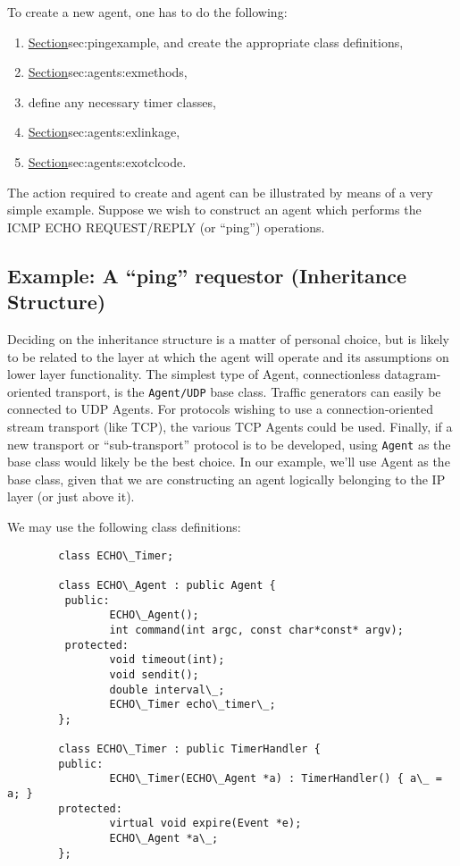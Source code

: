 To create a new agent, one has to do the following:
\begin{enumerate}\itemsep0pt
        \item \href{decide its inheritance structure}{Section}{sec:pingexample},
                and create the appropriate class definitions,
        \item \href{define the \fcn[]{recv} and \fcn[]{timeout} methods}{%
                Section}{sec:agents:exmethods},
        \item define any necessary timer classes,
        \item \href{define OTcl linkage functions}{Section}{sec:agents:exlinkage},
        \item \href{write the necessary OTcl code to access the agent}{Section}{sec:agents:exotclcode}.
\end{enumerate}

The action required to create and agent can be illustrated
by means of a very simple example.
Suppose we wish to construct an agent which performs
the ICMP ECHO REQUEST/REPLY (or ``ping'') operations.

\subsection{Example: A ``ping'' requestor (Inheritance Structure)}
\label{sec:pingexample}

Deciding on the inheritance structure is a matter of personal choice, but is
likely to be related to the layer at which the agent will operate
and its assumptions on lower layer functionality.
The simplest type of Agent, connectionless datagram-oriented transport, is
the {\tt Agent/UDP} base class.  Traffic generators can easily be connected
to UDP Agents.
For protocols wishing to use a connection-oriented stream transport
(like TCP), the various TCP Agents could be used.
Finally, if a new transport or ``sub-transport'' protocol
is to be developed, using {\tt Agent}
as the base class would likely be the best choice.
In our example, we'll use Agent as the base class, given that
we are constructing an agent logically belonging to the IP layer
(or just above it).

We may use the following class definitions:
\begin{verbatim}
        class ECHO\_Timer;
 
        class ECHO\_Agent : public Agent {
         public:
                ECHO\_Agent();
                int command(int argc, const char*const* argv);
         protected:
                void timeout(int);
                void sendit();
                double interval\_;
                ECHO\_Timer echo\_timer\_;
        };

        class ECHO\_Timer : public TimerHandler {
        public:
                ECHO\_Timer(ECHO\_Agent *a) : TimerHandler() { a\_ = a; }
        protected:
                virtual void expire(Event *e);
                ECHO\_Agent *a\_;
        }; 
\end{verbatim}

